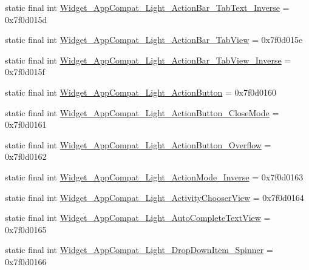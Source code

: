 \begin{DoxyCompactItemize}
\item 
static final int \mbox{\hyperlink{classcom_1_1google_1_1android_1_1gms_1_1R_1_1style_af2506cc460d4d497a88036f588bf7fed}{Widget\+\_\+\+App\+Compat\+\_\+\+Light\+\_\+\+Action\+Bar\+\_\+\+Tab\+Text\+\_\+\+Inverse}} = 0x7f0d015d
\item 
static final int \mbox{\hyperlink{classcom_1_1google_1_1android_1_1gms_1_1R_1_1style_ad74510a2cd8b4a1f51b67d638cf17e1b}{Widget\+\_\+\+App\+Compat\+\_\+\+Light\+\_\+\+Action\+Bar\+\_\+\+Tab\+View}} = 0x7f0d015e
\item 
static final int \mbox{\hyperlink{classcom_1_1google_1_1android_1_1gms_1_1R_1_1style_afa311fa886ef108b07659c63e8af8820}{Widget\+\_\+\+App\+Compat\+\_\+\+Light\+\_\+\+Action\+Bar\+\_\+\+Tab\+View\+\_\+\+Inverse}} = 0x7f0d015f
\item 
static final int \mbox{\hyperlink{classcom_1_1google_1_1android_1_1gms_1_1R_1_1style_aa03fd5e804f453a8214a7780d0ccde93}{Widget\+\_\+\+App\+Compat\+\_\+\+Light\+\_\+\+Action\+Button}} = 0x7f0d0160
\item 
static final int \mbox{\hyperlink{classcom_1_1google_1_1android_1_1gms_1_1R_1_1style_a8bdc76203afcbbc38311a1787455b087}{Widget\+\_\+\+App\+Compat\+\_\+\+Light\+\_\+\+Action\+Button\+\_\+\+Close\+Mode}} = 0x7f0d0161
\item 
static final int \mbox{\hyperlink{classcom_1_1google_1_1android_1_1gms_1_1R_1_1style_ace64d849ea7c8f93ca2feda47f62ddf0}{Widget\+\_\+\+App\+Compat\+\_\+\+Light\+\_\+\+Action\+Button\+\_\+\+Overflow}} = 0x7f0d0162
\item 
static final int \mbox{\hyperlink{classcom_1_1google_1_1android_1_1gms_1_1R_1_1style_ac3f321047c2037d9782bbdab789c47b0}{Widget\+\_\+\+App\+Compat\+\_\+\+Light\+\_\+\+Action\+Mode\+\_\+\+Inverse}} = 0x7f0d0163
\item 
static final int \mbox{\hyperlink{classcom_1_1google_1_1android_1_1gms_1_1R_1_1style_acd920392ffa0356d7a2bedb3ca8e78f7}{Widget\+\_\+\+App\+Compat\+\_\+\+Light\+\_\+\+Activity\+Chooser\+View}} = 0x7f0d0164
\item 
static final int \mbox{\hyperlink{classcom_1_1google_1_1android_1_1gms_1_1R_1_1style_a6a2f63f4936fe5e84731c75146f50a4a}{Widget\+\_\+\+App\+Compat\+\_\+\+Light\+\_\+\+Auto\+Complete\+Text\+View}} = 0x7f0d0165
\item 
static final int \mbox{\hyperlink{classcom_1_1google_1_1android_1_1gms_1_1R_1_1style_a22f0f4dc3ab0fa937318f09bdc7651bf}{Widget\+\_\+\+App\+Compat\+\_\+\+Light\+\_\+\+Drop\+Down\+Item\+\_\+\+Spinner}} = 0x7f0d0166
\item 

\end{DoxyCompactItemize}
